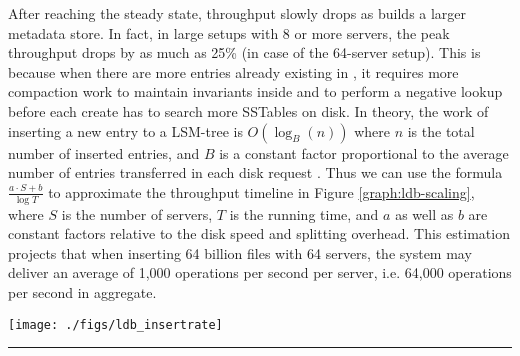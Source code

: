 After reaching the steady state, throughput slowly drops
as \tfs builds a larger metadata store.
In fact, in large setups with 8 or more servers,
the peak throughput drops by as much as 25\% (in case of the 64-server setup).
This is because when there are more entries already existing in \tfs,
it requires more compaction work to maintain invariants inside \ldb
and to perform a negative lookup before each create
has to search more SSTables on disk.
In theory, the work of inserting a new entry to a LSM-tree is $O(\log_{B}(n))$
where $n$ is the total number of inserted entries, and $B$ is a constant factor
proportional to the average number of entries transferred in each disk request
\cite{Bender2007}.
Thus we can use the formula $\frac{a\cdot S+b}{\log{T}}$ to
approximate the throughput timeline in Figure \ref{graph:ldb-scaling},
where $S$ is the number of servers, $T$ is the running time,
and $a$ as well as $b$ are constant factors
relative to the disk speed and splitting overhead.
This estimation projects that when inserting 64 billion files with 64 servers,
the system may deliver an average of 1,000 operations per second per server,
i.e. 64,000 operations per second in aggregate.

\begin{figure*}[t]
\centerline{\texttt{[image: ./figs/ldb\_insertrate]}}
\vspace{10pt}
\caption{\normalsize
\textit{Our middleware metadata service prototype shows promising scalability
up to 64 servers.
Note that at the end of the experiment,
the throughput drops to zero
because clients stop creating files as they finish 1 million files per client.
And the solid lines in each configuration are Bezier
curves to smooth the variability.}
}
\vspace{10pt}
\hrule
\label{graph:ldb-scaling}
\end{figure*}


